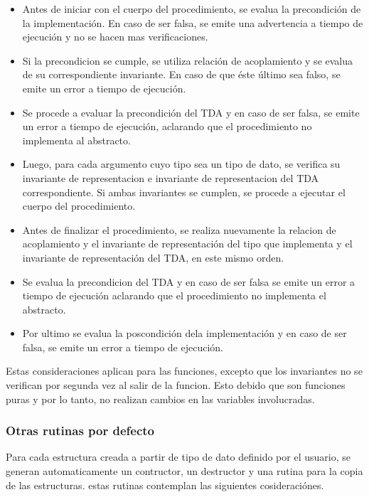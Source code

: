 \begin{itemize}

  \item Antes de iniciar con el cuerpo del procedimiento, se
  evalua la precondición de la implementación. En caso de ser falsa, se 
  emite una advertencia a tiempo de ejecución y no se hacen mas verificaciones.

  \item Si la precondicion se cumple, se utiliza relación de acoplamiento y se
  evalua de su correspondiente invariante. En caso de que éste último sea
  falso, se emite un error a tiempo de ejecución.

  \item Se procede a evaluar la precondición del TDA y en caso de ser falsa, 
  se emite un error a tiempo de ejecución, aclarando que el procedimiento no
  implementa al abstracto.

  \item Luego, para cada argumento cuyo tipo sea un tipo de dato, se verifica
  su invariante de representacion e invariante de representacion del TDA
  correspondiente. Si ambas invariantes se cumplen, se procede a ejecutar el
  cuerpo del procedimiento.

  \item Antes de finalizar el procedimiento, se realiza nuevamente la relacion
  de acoplamiento y el invariante de representación del tipo que implementa y
  el invariante de representación del TDA, en este mismo orden.

  \item Se evalua la precondicion del TDA y en caso de ser falsa se emite un
  error a tiempo de ejecución aclarando que el procedimiento no implementa el
  abstracto.

  \item Por ultimo se evalua la poscondición dela implementación y en caso de
  ser falsa, se emite un error a tiempo de ejecución.

\end{itemize}

Estas consideraciones aplican para las funciones, excepto que los invariantes
no se verifican por segunda vez al salir de la funcion. Esto debido que son
funciones puras y por lo tanto, no realizan cambios en las variables
involucradas.

\subsubsection{Otras rutinas por defecto}
Para cada estructura creada a partir de tipo de dato definido por el usuario,
se generan automaticamente un contructor, un destructor y una rutina para la
copia de las estructuras. estas rutinas contemplan las siguientes
cosideraciónes.

